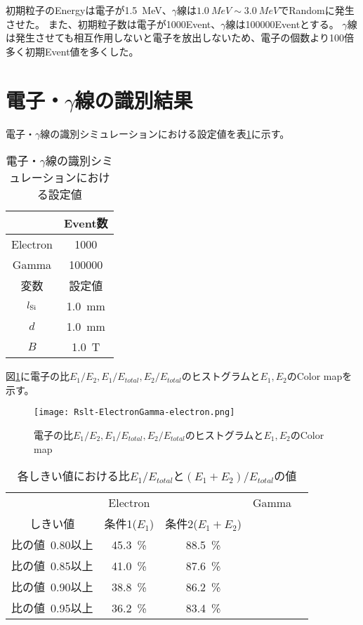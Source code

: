 \documentclass[a4paper,10pt]{jreport}
\begin{document}
初期粒子のEnergyは電子が\SI{1.5}{MeV}、$\gamma$線は$\SI{1.0}{MeV}\sim\SI{3.0}{MeV}$でRandomに発生させた。
また、初期粒子数は電子が1000Event、$\gamma$線は100000Eventとする。
$\gamma$線は発生させても相互作用しないと電子を放出しないため、電子の個数より100倍多く初期Event値を多くした。



\section{電子・$\gamma$線の識別結果}

電子・$\gamma$線の識別シミュレーションにおける設定値を表\ref{Tab-ElectronGamma-Settei}に示す。

\begin{table}[H] 
	\center
	\caption{電子・$\gamma$線の識別シミュレーションにおける設定値} \label{Tab-ElectronGamma-Settei}
	\begin{tabular}{cc}
	\hline
	 & Event数 \\
	 \hline
	Electron & 1000 \\
	Gamma & 100000 \\
	\hline
	変数 & 設定値 \\
	\hline
	$l_{\rm{Si}}$ & \SI{1.0}{mm} \\
	$d$ & \SI{1.0}{mm} \\
	$B$ & \SI{1.0}{T} \\
	\hline
	\end{tabular}
\end{table}

図\ref{Rslt-ElectronGamma-electron}に電子の比$E_1/E_2,E_1/E_{total},E_2/E_{total}$のヒストグラムと$E_1,E_2$のColor mapを示す。

\begin{figure}[H]
	\center
	\texttt{[image: Rslt-ElectronGamma-electron.png]}
	\caption{電子の比$E_1/E_2,E_1/E_{total},E_2/E_{total}$のヒストグラムと$E_1,E_2$のColor map}
	\label{Rslt-ElectronGamma-electron}
\end{figure}


\begin{table}[H]
	\center
	\caption{各しきい値における比$E_1/E_{total}$と$(E_1+E_2)/E_{total}$の値} \label{Tab-82SeDoubleDecayTable}
	\begin{tabular}{c|cc|cc}
		\hline
		 & Electron &  & Gamma &  \\
		しきい値 & 条件1($E_1$) & 条件2($E_1+E_2$)\\
		\hline
		比の値\ 0.80以上 & \SI{45.3}{\%} & \SI{88.5}{\%} &  &  \\
		比の値\ 0.85以上 & \SI{41.0}{\%} & \SI{87.6}{\%} &  &  \\
		比の値\ 0.90以上 & \SI{38.8}{\%} & \SI{86.2}{\%} &  &  \\
		比の値\ 0.95以上 & \SI{36.2}{\%} & \SI{83.4}{\%} &  &  \\
		\hline
	\end{tabular}
\end{table}
\end{document}
